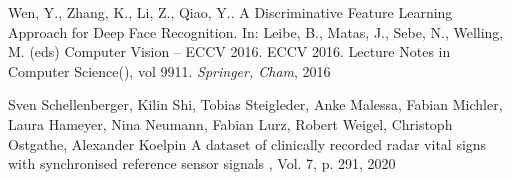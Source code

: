 \begin{bib}[100]
Wen, Y., Zhang, K., Li, Z., Qiao, Y.. A Discriminative Feature Learning Approach for Deep Face Recognition. In: Leibe, B., Matas, J., Sebe, N., Welling, M. (eds) Computer Vision – ECCV 2016. ECCV 2016. Lecture Notes in Computer Science(), vol 9911. {\it Springer, Cham}, 2016

Sven Schellenberger, Kilin Shi, Tobias Steigleder, Anke Malessa, Fabian Michler, Laura Hameyer, Nina Neumann, Fabian Lurz, Robert Weigel, Christoph Ostgathe, Alexander Koelpin
\newblock A dataset of clinically recorded radar vital signs with synchronised reference sensor signals
, Vol. 7, p. 291, 2020

\end{bib}









